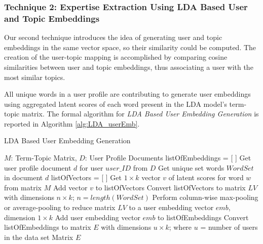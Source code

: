         \subsubsection{Technique 2: Expertise Extraction Using LDA Based User and Topic Embeddings\label{sec:LDAbased_technique}}
        
            Our second technique introduces the idea of generating user and topic embeddings in the same vector space, so their similarity could be computed. The creation of the user-topic mapping is accomplished by comparing cosine similarities between user and topic embeddings, thus associating a user with the most similar topics. 
            
            All unique words in a user profile are contributing to generate user embeddings using aggregated latent scores of each word present in the LDA model's term-topic matrix. The formal algorithm for \emph{LDA Based User Embedding Generation} is reported in Algorithm \ref{alg:LDA_userEmb}. 
            
            \begin{algorithm}
                \caption{LDA Based User Embedding Generation}
                \label{alg:LDA_userEmb}
                \begin{algorithmic}[1]
                    \REQUIRE $M$: Term-Topic Matrix, $D$: User Profile Documents 
                    \STATE listOfEmbeddings = [ ]
                        \STATE Get user profile document $d$ for user $user\_ID$ from $D$
                        \STATE Get unique set words $WordSet$ in document $d$
                        \STATE listOfVectors = [ ]
                        \STATE
                            \STATE Get $1 \times k$ vector $v$ of latent scores for word $w$ from matrix $M$
                            \STATE Add vector $v$ to listOfVectors
                        \ENDFOR
                        \STATE Convert listOfVectors to matrix $LV$ with dimensions $n \times k$; $n=length(WordSet)$
                        \STATE Perform column-wise max-pooling or average-pooling to reduce matrix $LV$ to a user embedding vector $emb$, dimension $1 \times k$
                        \STATE Add user embedding vector $emb$ to listOfEmbeddings
                    \ENDFOR
                    \STATE Convert listOfEmbeddings to matrix $E$ with dimensions $u \times k$; where $u$ = number of users in the data set
                    \RETURN Matrix $E$
                \end{algorithmic}
            \end{algorithm}
        
